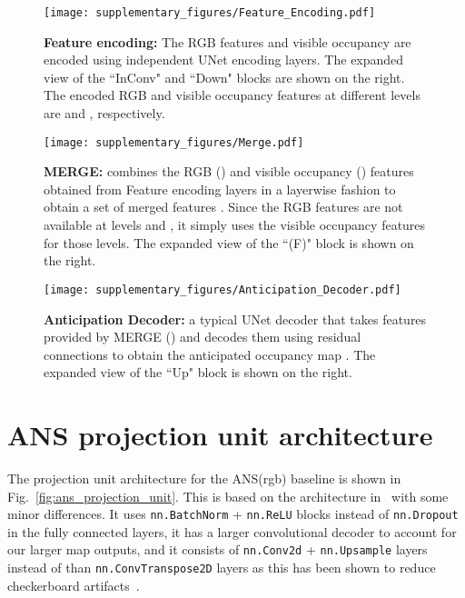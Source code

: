 \documentclass[runningheads]{llncs}
\newcommand{\code}[1]{\texttt{\small #1}}
\begin{document}
\begin{figure}[ht!]
    \centering
    \texttt{[image: supplementary\_figures/Feature\_Encoding.pdf]}
    \caption{\small\textbf{Feature encoding:} The RGB features and visible occupancy are encoded using independent UNet encoding layers. The expanded view of the ``InConv" and ``Down" blocks are shown on the right. The encoded RGB and visible occupancy features at different levels are  and , respectively.}
    \label{fig:feature_encoding}
\end{figure}

\begin{figure}[ht!]
    \centering
    \texttt{[image: supplementary\_figures/Merge.pdf]}
    \caption{\small \textbf{MERGE:} combines the RGB () and visible occupancy () features obtained from Feature encoding layers in a layerwise fashion to obtain a set of merged features . Since the RGB features are not available at levels  and , it simply uses the visible occupancy features for those levels. The expanded view of the ``(F)" block is shown on the right.}
    \label{fig:merge}
\end{figure}

\begin{figure}[ht!]
    \centering
    \texttt{[image: supplementary\_figures/Anticipation\_Decoder.pdf]}
    \caption{\small \textbf{Anticipation Decoder:} a typical UNet decoder that takes features provided by MERGE () and decodes them using residual connections to obtain the anticipated occupancy map . The expanded view of the ``Up" block is shown on the right. }
    \label{fig:anticipation_decoder}
\end{figure}

\section{ANS projection unit architecture}
The projection unit architecture for the ANS(rgb) baseline is shown in Fig.~\ref{fig:ans_projection_unit}. This is based on the architecture in~\cite{chaplot2020learning} with some minor differences. It uses \code{nn.BatchNorm} + \code{nn.ReLU} blocks instead of \code{nn.Dropout} in the fully connected layers, it has a larger convolutional decoder to account for our larger map outputs, and it consists of \code{nn.Conv2d} + \code{nn.Upsample} layers instead of than \code{nn.ConvTranspose2D} layers as this has been shown to reduce checkerboard artifacts~\cite{odena2016deconvolution}.
\end{document}
